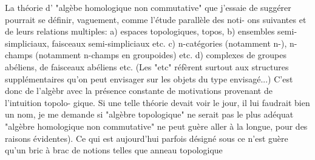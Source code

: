  La théorie d' "algèbe homologique non commutative" que j'essaie de
suggérer pourrait se définir, vaguement, comme l'étude parallèle des noti-%
ons suivantes et de leurs relations multiples: a) espaces topologiques,
topos, b) ensembles semi-simpliciaux, faisceaux semi-simpliciaux etc.
c) n-catégories (notamment n-), n-champs (notamment n-champs en
groupoides) etc. d) complexes de groupes abéliens, de faisceaux abéliens
etc. (Les "etc" réfèrent surtout aux structures supplémentaires qu'on 
peut envisager sur les objets du type envisagé...) C'est donc de l'algèbr
avec la présence constante de motivations provenant de l'intuition topolo-%
gique. Si une telle théorie devait voir le jour, il lui faudrait bien un
nom, je me demande si "algèbre topologique" ne serait pas le plus adéquat
\hand{(}"algèbre homologique non commutative" ne peut guère aller à la longue, pour
des raisons évidentes). Ce qui est aujourd'hui parfois désigné sous ce
 n'est guère qu'un bric à brac de notions \hand{(}telles que anneau topologique
